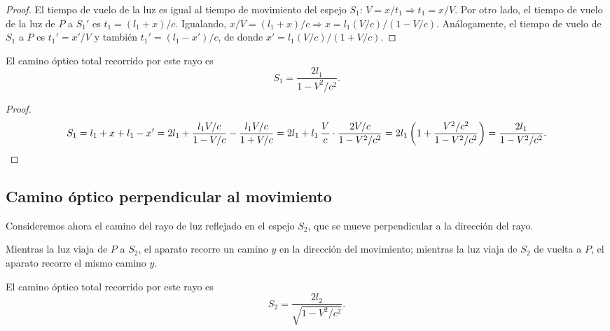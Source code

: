 \begin{proof}
El tiempo de vuelo de la luz es igual al tiempo de movimiento del espejo
$S_1$: $V=x/t_1 \Rightarrow t_1=x/V$. Por otro lado, el tiempo de vuelo
de la luz de $P$ a $S_1'$ es $t_1=(l_1+x)/c$. Igualando,
$x/V=(l_1+x)/c \Rightarrow x=l_1(V/c)/(1-V/c)$. Análogamente, el tiempo
de vuelo de $S_1$ a $P$ es $t_1'=x'/V$ y también $t_1'=(l_1-x')/c$, de
donde $x'=l_1(V/c)/(1+V/c)$. \qedhere
\end{proof}

\begin{proposicionc}
El camino óptico total recorrido por este rayo es
\[
S_1 = \frac{2l_1}{1-V^2/c^2} .
\]
\end{proposicionc}

\begin{proof}
\[
S_1 = l_1+x+l_1-x' = 2l_1 + \frac{l_1V/c}{1-V/c} - \frac{l_1V/c}{1+V/c}
= 2l_1 + l_1\, \frac{V}{c}\cdot\frac{2V/c}{1-V^2/c^2} = 2l_1\left(1 +
\frac{V^2/c^2}{1-V^2/c^2}\right) = \frac{2l_1}{1-V^2/c^2} . \qedhere
\]
\end{proof}

\subsection{Camino óptico perpendicular al movimiento}

Consideremos ahora el camino del rayo de luz reflejado en el espejo
$S_2$, que se mueve perpendicular a la dirección del rayo.

\begin{center}
\end{center}

Mientras la luz viaja de $P$ a $S_2$, el aparato recorre un camino $y$
en la dirección del movimiento; mientras la luz viaja de $S_2$ de vuelta
a $P$, el aparato recorre el mismo camino $y$.

\begin{proposicionc}
El camino óptico total recorrido por este rayo es
\[
S_2 = \frac{2l_2}{\sqrt{1-V^2/c^2}} .
\]
\end{proposicionc}

